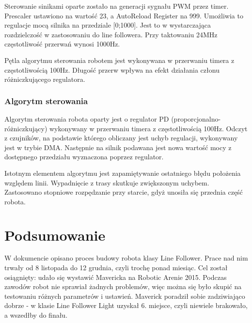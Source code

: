 \documentclass[12pt,a4paper]{article}
\begin{document}
Sterowanie sinikami oparte zostało na generacji sygnału PWM przez timer. Prescaler ustawiono na wartość 23, a AutoReload Register na 999. Umożliwia to regulacje mocą silnika na przedziale [0;1000]. Jest to w wystarczająca rozdzielczość w zastosowaniu do line followera. Przy taktowaniu 24MHz częstotliwość przerwań wynosi 1000Hz.

Pętla algorytmu sterowania robotem jest wykonywana w przerwaniu timera z częstotliwością 100Hz. Długość przerw wpływa na efekt działania członu różniczkującego regulatora. 


\subsubsection{Algorytm sterowania}
Algorytm sterowania robota oparty jest o regulator PD (proporcjonalno-różniczkujący) wykonywany w przerwaniu timera z częstotliwością 100Hz. Odczyt z czujników, na podstawie którego obliczany jest uchyb regulacji, wykonywany jest w trybie DMA. Następnie na silnik podawana jest nowa wartość mocy z dostępnego przedziału wyznaczona poprzez regulator. 

Istotnym elementem algorytmu jest zapamiętywanie ostatniego błędu położenia względem linii. Wypadnięcie z trasy skutkuje zwiększonym uchybem. Zastosowano stopniowe rozpędzanie przy starcie, gdyż unosiła się przednia część robota.  


\section{Podsumowanie}

W dokumencie opisano proces budowy robota klasy Line Follower. Prace nad nim trwały od 8 listopada do 12 grudnia, czyli trochę ponad miesiąc. Cel został osiągnięty: udało się wystawić Mavericka na Robotic Arenie 2015. Podczas zawodów robot nie sprawiał żadnych problemów, więc można się było skupić na testowaniu różnych parametrów i ustawień. Maverick poradził sobie zadziwiająco dobrze - w klasie Line Follower Light uzyskał 6. miejsce, czyli niewiele brakowało, a wszedłby do finału.

\end{document}

